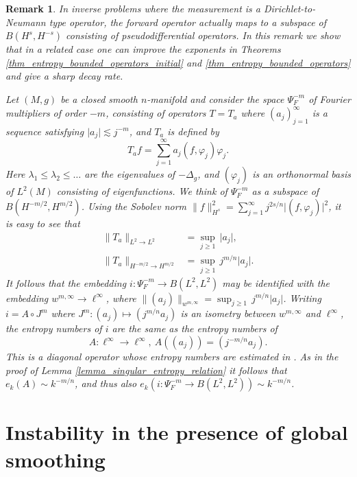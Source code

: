 \documentclass[12pt,twoside]{amsart}
\numberwithin{equation}{section}
\renewcommand{\leq}{\leqslant}
\renewcommand{\geq}{\geqslant}
\newtheorem{remark}[theorem]{Remark}
\newcommand{\abs}[1]{\lvert #1 \rvert}          %
\newcommand{\norm}[1]{\lVert #1 \rVert}         %
\begin{document}
\begin{remark} \label{remark_entropy_multiplier}
In inverse problems where the measurement is a Dirichlet-to-Neumann type operator, the forward operator actually maps to a subspace of $B(H^s, H^{-s})$ consisting of pseudodifferential operators. In this remark we show that in a related case one can improve the exponents in Theorems \ref{thm_entropy_bounded_operators_initial} and \ref{thm_entropy_bounded_operators} and give a sharp decay rate. 

Let $(M,g)$ be a closed smooth $n$-manifold and consider the space $\Psi^{-m}_{F}$ of Fourier multipliers of order $-m$, consisting of operators $T = T_a$ where $(a_j)_{j=1}^{\infty}$ is a sequence satisfying $\abs{a_j} \lesssim j^{-m}$, and $T_a$ is defined by 
\[
T_a f = \sum_{j=1}^{\infty} a_j (f, \varphi_j) \varphi_j.
\]
Here $\lambda_1 \leq \lambda_2 \leq \ldots $ are the eigenvalues of $-\Delta_g$, and $(\varphi_j)$ is an orthonormal basis of $L^2(M)$ consisting of eigenfunctions. We think of $\Psi^{-m}_{F}$ as a subspace of $B(H^{-m/2}, H^{m/2})$. Using the Sobolev norm $\norm{f}_{H^s}^2 = \sum_{j=1}^{\infty} j^{2s/n} \abs{(f,\varphi_j)}^2$, it is easy to see that 
\begin{align*}
\norm{T_a}_{L^2 \to L^2} &= \sup_{j \geq 1} \,\abs{a_j}, \\
\norm{T_a}_{H^{-m/2} \to H^{m/2}} &= \sup_{j \geq 1} \,j^{m/n} \abs{a_j}.
\end{align*}
It follows that the embedding $i: \Psi^{-m}_F \to B(L^2, L^2)$ may be identified with the embedding $w^{m,\infty} \to \ell^{\infty}$, where $\norm{(a_j)}_{w^{m,\infty}} = \sup_{j \geq 1} \,j^{m/n} \abs{a_j}$. Writing $i = A \circ J^m$ where $J^m: (a_j) \mapsto (j^{m/n} a_j)$ is an isometry between $w^{m,\infty}$ and $\ell^{\infty}$, the entropy numbers of $i$ are the same as the entropy numbers of 
\[
A: \ell^{\infty} \to \ell^{\infty}, \ A((a_j)) = (j^{-m/n} a_j).
\]
This is a diagonal operator whose entropy numbers are estimated in \cite[Proposition 1.3.2]{CS90}. As in the proof of Lemma \ref{lemma_singular_entropy_relation} it follows that $e_k(A) \sim k^{-m/n}$, and thus also $e_k(i: \Psi^{-m}_F \to B(L^2, L^2)) \sim k^{-m/n}$.
\end{remark}





\section{Instability in the presence of global smoothing}
\label{sec:examples1}
\end{document}
